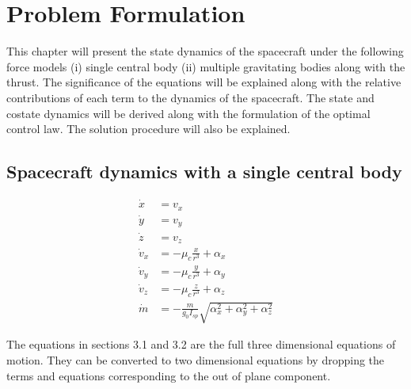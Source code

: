 \chapter{Problem Formulation}

\ifpdf
    \graphicspath{{Chapter3/Figs/Raster/}{Chapter3/Figs/PDF/}{Chapter3/Figs/}}
\else
    \graphicspath{{Chapter3/Figs/Vector/}{Chapter3/Figs/}}
\fi

This chapter will present the state dynamics of the spacecraft under the following force models (i) single central body (ii) multiple gravitating bodies along with the thrust. The significance of the equations will be explained along with the relative contributions of each term to the dynamics of the spacecraft. The state and costate dynamics will be derived along with the formulation of the optimal control law. The solution procedure will also be explained.

\section{Spacecraft dynamics with a single central body}
\begin{align}
	\dot{x}&=v_x\\
	\dot{y}&=v_y\\
	\dot{z}&=v_z\\
	\dot{v}_x&=-\mu_c\frac{x}{r^3}+\alpha_x\\
	\dot{v}_y&=-\mu_c\frac{y}{r^3}+\alpha_y\\
	\dot{v}_z&=-\mu_c\frac{z}{r^3}+\alpha_z\\
	\dot{m}&=-\frac{m}{g_0 I_{sp}}\sqrt{\alpha_x^2+\alpha_y^2+\alpha_z^2}
\end{align}



The equations in sections 3.1 and 3.2 are the full three dimensional equations of motion. They can be converted to two dimensional equations by dropping the terms and equations corresponding to the out of plane component.

